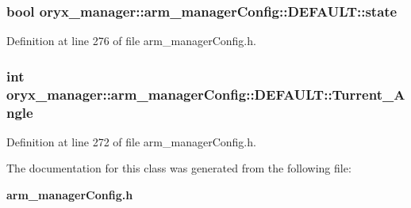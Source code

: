 \subsubsection[{state}]{\setlength{\rightskip}{0pt plus 5cm}bool {\bf oryx\-\_\-manager\-::arm\-\_\-manager\-Config\-::\-D\-E\-F\-A\-U\-L\-T\-::state}}\label{classoryx__manager_1_1arm__managerConfig_1_1DEFAULT_a1105f30fe172dddeca839d9f45e5ff4d}


\-Definition at line 276 of file arm\-\_\-manager\-Config.\-h.

\subsubsection[{\-Turrent\-\_\-\-Angle}]{\setlength{\rightskip}{0pt plus 5cm}int {\bf oryx\-\_\-manager\-::arm\-\_\-manager\-Config\-::\-D\-E\-F\-A\-U\-L\-T\-::\-Turrent\-\_\-\-Angle}}\label{classoryx__manager_1_1arm__managerConfig_1_1DEFAULT_af0ce870cf2f4d0910e2e94aff7cb29b2}


\-Definition at line 272 of file arm\-\_\-manager\-Config.\-h.



\-The documentation for this class was generated from the following file\-:\begin{DoxyCompactItemize}
\item 
{\bf arm\-\_\-manager\-Config.\-h}\end{DoxyCompactItemize}

